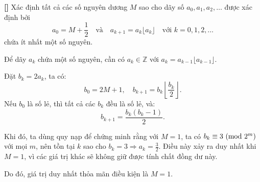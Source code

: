 \documentclass[../05-modular-arithmetic-a.tex]{subfiles}
\begin{document}
\begin{example*}\label{example:IMO-2015-N1}\textbf{[]}
    Xác định tất cả các số nguyên dương \( M \) sao cho dãy số \( a_0, a_1, a_2, \dots \) được xác định bởi  
    \[
        a_0 = M + \frac{1}{2}\quad \text{và}\quad a_{k+1} = a_k \lfloor a_k \rfloor \quad \text{với } k = 0, 1, 2, \dots
    \]
    chứa ít nhất một số nguyên.
\end{example*}

\begin{story*}
    Để dãy \( a_k \) chứa một số nguyên, cần có \( a_k \in \mathbb{Z} \) với \( a_k = a_{k-1} \lfloor a_{k-1} \rfloor \).

    Đặt \( b_k = 2a_k \), ta có:
    \[
        b_0 = 2M + 1, \quad b_{k+1} = b_k \left\lfloor \frac{b_k}{2} \right\rfloor.
    \]
    Nếu \( b_0 \) là số lẻ, thì tất cả các \( b_k \) đều là số lẻ, và:
    \[
        b_{k+1} = \frac{b_k(b_k - 1)}{2}.
    \]

    Khi đó, ta dùng quy nạp để chứng minh rằng với \( M = 1 \), ta có \( b_k \equiv 3 \ (\mathrm{mod}\ 2^m) \) với mọi \( m \), nên tồn tại \( k \) sao cho \( b_k = 3 \Rightarrow a_k = \frac{3}{2} \). Điều này xảy ra duy nhất khi \( M = 1 \), vì các giá trị khác sẽ không giữ được tính chất đồng dư này.

    Do đó, giá trị duy nhất thỏa mãn điều kiện là \( \boxed{M = 1} \).
\end{story*}

\bigbreak
\end{document}
